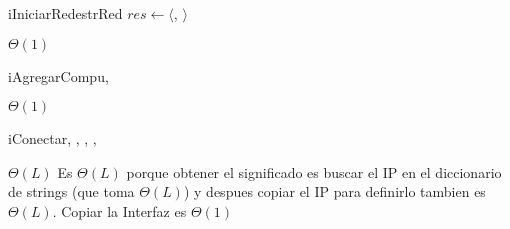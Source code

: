 \begin{Algoritmos}


  \begin{algoritmo}{iIniciarRed}{}{estrRed}
    $res \gets \langle$\vacio{}, \vacio{}$\rangle$ 
  \end{algoritmo}
  \datosAlgoritmo{} %
  {} %
  {} %
  {$\Theta(1)$} %
  {} %

  \begin{algoritmo}{iAgregarCompu}{, }{}
     
     
  \end{algoritmo}
  \datosAlgoritmo{} %
  {} %
  {} %
  {$\Theta(1)$} %
  {} %

  
  
  \begin{algoritmo}{iConectar}{, , , , }{}
     
     
  \end{algoritmo}
  \datosAlgoritmo
  {} %
  {} %
  {} %
  {$\Theta(L)$} %
  {Es $\Theta(L)$ porque obtener el significado es buscar el IP en el diccionario de strings (que toma $\Theta(L)$) y despues copiar el IP para definirlo tambien es $\Theta(L)$. Copiar la Interfaz es $\Theta(1)$ } %
  

\end{Algoritmos}
